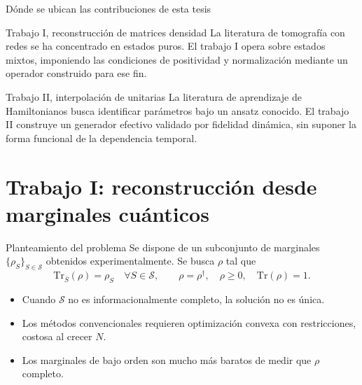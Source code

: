 \documentclass[10pt,aspectratio=169]{beamer}
\newcommand{\Tr}{\mathrm{Tr}}
\newcommand{\dens}{\rho}
\begin{document}
\begin{frame}{Dónde se ubican las contribuciones de esta tesis}
  \vfill
  \begin{block}{Trabajo I, reconstrucción de matrices densidad}
    La literatura de tomografía con redes se ha concentrado en estados puros. El trabajo I opera sobre estados mixtos, imponiendo las condiciones de positividad y normalización mediante un operador construido para ese fin.
  \end{block}
  \pause
  \begin{block}{Trabajo II, interpolación de unitarias}
    La literatura de aprendizaje de Hamiltonianos busca identificar parámetros bajo un ansatz conocido. El trabajo II construye un generador efectivo validado por fidelidad dinámica, sin suponer la forma funcional de la dependencia temporal.
  \end{block}
  \vfill
\end{frame}

\section{Trabajo I: reconstrucción desde marginales cuánticos}

\begin{frame}{Planteamiento del problema}
  Se dispone de un subconjunto de marginales $\{\dens_S\}_{S \in \mathcal{S}}$ obtenidos experimentalmente. Se busca $\dens$ tal que
  \[
    \Tr_{\bar{S}}(\dens) = \dens_S \quad \forall S \in \mathcal{S},
    \qquad \dens = \dens^\dagger, \quad \dens \geq 0, \quad \Tr(\dens)=1 .
  \]
  \pause
  \vfill
  \begin{itemize}
    \item Cuando $\mathcal{S}$ no es informacionalmente completo, la solución no es única.
    \item Los métodos convencionales requieren optimización convexa con restricciones, costosa al crecer $N$.
    \item Los marginales de bajo orden son mucho más baratos de medir que $\dens$ completo.
  \end{itemize}
\end{frame}
\end{document}
